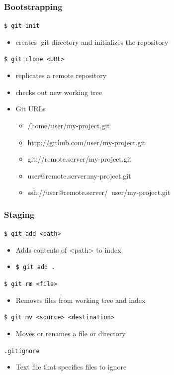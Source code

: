 \documentclass[english,compress]{beamer}
\begin{document}
\begin{frame}[fragile]
    \frametitle{Bootstrapping}
    
    \verb|$ git init|
    \begin{itemize}
        \item creates .git directory and initializes the repository
    \end{itemize}
    \verb|$ git clone <URL>|
    \begin{itemize}
        \item replicates a remote repository
        \item checks out new working tree
        \item Git URLs
            \begin{itemize}
                \item /home/user/my-project.git
                \item http://github.com/user/my-project.git
                \item git://remote.server/my-project.git
                \item user@remote.server:my-project.git
                \item ssh://user@remote.server/~user/my-project.git
            \end{itemize}
    \end{itemize}
\end{frame}

\begin{frame}[fragile]
    \frametitle{Staging}
    \verb|$ git add <path>|
    \begin{itemize}
        \item Adds contents of <path> to index
        \item \verb|$ git add .|
    \end{itemize}
    
    \verb|$ git rm <file>|
    \begin{itemize}
        \item Removes files from working tree and index
    \end{itemize}

    \verb|$ git mv <source> <destination>|
    \begin{itemize}
        \item Moves or renames a file or directory
    \end{itemize}
    \verb|.gitignore|
    \begin{itemize}
        \item Text file that specifies files to ignore
    \end{itemize}
\end{frame}
\end{document}
